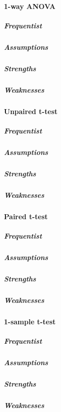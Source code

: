 \paragraph{1-way ANOVA}
\subparagraph{Frequentist}
\subparagraph{Assumptions}
\subparagraph{Strengths}
\subparagraph{Weaknesses}

\paragraph{Unpaired t-test}
\subparagraph{Frequentist}
\subparagraph{Assumptions}
\subparagraph{Strengths}
\subparagraph{Weaknesses}

\paragraph{Paired t-test}
\subparagraph{Frequentist}
\subparagraph{Assumptions}
\subparagraph{Strengths}
\subparagraph{Weaknesses}

\paragraph{1-sample t-test}
\subparagraph{Frequentist}
\subparagraph{Assumptions}
\subparagraph{Strengths}
\subparagraph{Weaknesses}
